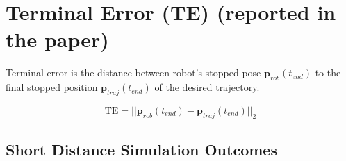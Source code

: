 \section{Terminal Error (TE) (reported in the paper)}
Terminal error is the distance between robot's stopped pose 
$\boldsymbol{p}_{rob}(t_{end})$ 
to the final stopped position $\boldsymbol{p}_{traj}(t_{end})$ 
of the desired trajectory.

\begin{equation} 
     \text{TE} = || \boldsymbol{p}_{rob}(t_{end}) - 
     \boldsymbol{p}_{traj}(t_{end}) ||_2
\end{equation}

\subsection{Short Distance Simulation Outcomes}
\vspace*{-0.5em}
